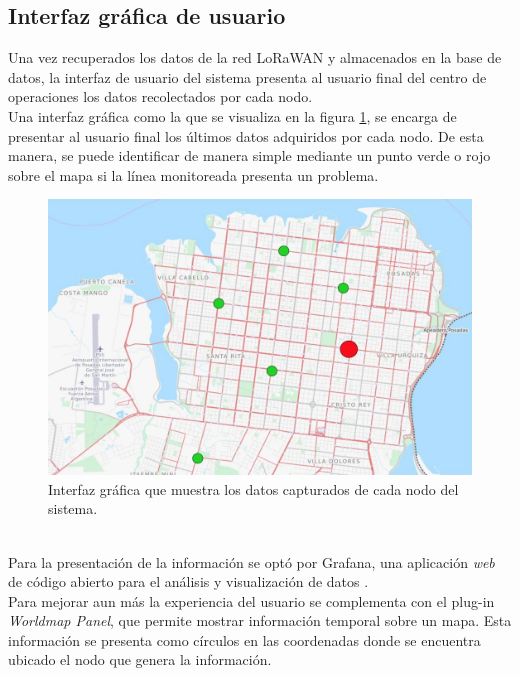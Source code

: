 \subsection{Interfaz gráfica de usuario}
Una vez recuperados los datos de la red LoRaWAN y almacenados en la base de datos, la interfaz de usuario del sistema presenta al usuario final del centro de operaciones los datos recolectados por cada nodo.\\
Una interfaz gráfica como la que se visualiza en la figura \ref{fig:guirequeridaporelcliente}, se encarga de presentar al usuario final los últimos datos adquiridos por cada nodo. De esta manera, se puede identificar de manera simple mediante un punto verde o rojo sobre el mapa si la línea monitoreada presenta un problema.
\begin{figure}[h!]
	\centering
	\includegraphics[width=0.9\linewidth]{Figures/GUI_requerida_por_el_cliente}
	\caption{Interfaz gráfica que muestra los datos capturados de cada nodo del sistema.}
	\label{fig:guirequeridaporelcliente}
\end{figure}\\
Para la presentación de la información se optó por Grafana, una aplicación \textit{web} de código abierto para el análisis y visualización de datos \citep{grafana}.\\
Para mejorar aun más la experiencia del usuario se complementa con el plug-in \textit{Worldmap Panel}, que permite mostrar información temporal sobre un mapa. Esta información se presenta como círculos en las coordenadas donde se encuentra ubicado el nodo que genera la información.\\
